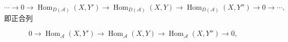 \[
\cdots\longrightarrow0\longrightarrow
\operatorname{Hom}_{D(\mathcal A)}(X,Y')\longrightarrow
\operatorname{Hom}_{D(\mathcal A)}(X,Y)\longrightarrow
\operatorname{Hom}_{D(\mathcal A)}(X,Y'')\longrightarrow0
\longrightarrow\cdots,
\]
即正合列

\[
0\longrightarrow\operatorname{Hom}_{\mathcal A}(X,Y')
\longrightarrow\operatorname{Hom}_{\mathcal A}(X,Y)
\longrightarrow\operatorname{Hom}_{\mathcal A}(X,Y'')
\longrightarrow0,
\]
\endgroup
